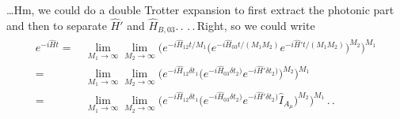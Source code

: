 \documentclass{report}
\begin{document}
\ldots Hm, we could do a double Trotter expansion to first extract the photonic part and then to separate $\hat H'$ and $\hat H_{B,03}$.\,. .\,.\,Right, so we could write
\begin{align}
\begin{aligned}
	e^{-i \hat H t} =&\, 
		\lim_{M_1 \to \infty} \lim_{M_2 \to \infty}
		\big(e^{-i \hat H_{12} t/M_1} 
			\big(e^{-i \hat H_{03} t/(M_1 M_2)} e^{-i \hat H' t/(M_1 M_2)}\big)^{M_2}
		\big)^{M_1}
	\\=&\, 
		\lim_{M_1 \to \infty} \lim_{M_2 \to \infty}
		\big(e^{-i \hat H_{12} \delta t_1} 
			\big(e^{-i \hat H_{03} \delta t_2)} e^{-i \hat H' \delta t_2)}\big)^{M_2}
		\big)^{M_1}
	\\=&\, 
		\lim_{M_1 \to \infty} \lim_{M_2 \to \infty}
		\big(e^{-i \hat H_{12} \delta t_1} 
			\big(e^{-i \hat H_{03} \delta t_2)} e^{-i \hat H' \delta t_2)} \hat I_{A_\mu} \big)^{M_2}
		\big)^{M_1}\,.\,.
\end{aligned}
\end{align}
\end{document}
